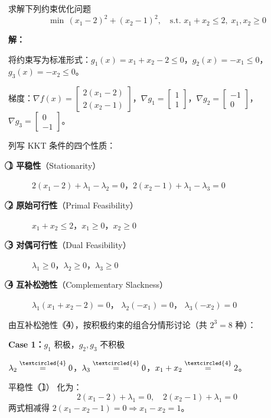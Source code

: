 \begin{example}[KKT条件求解]\label{ex:kkt-solve}
求解下列约束优化问题
\[
\min \, (x_1 - 2)^2 + (x_2 - 1)^2, \quad \text{s.t. } x_1 + x_2 \leq 2, \; x_1, x_2 \geq 0
\]

\textbf{解：}

\noindent 将约束写为标准形式：$g_1(x) = x_1 + x_2 - 2 \leq 0$，$g_2(x) = -x_1 \leq 0$，$g_3(x) = -x_2 \leq 0$。

梯度：$\nabla f(x) = \begin{bmatrix} 2(x_1-2) \\ 2(x_2-1) \end{bmatrix}$，$\nabla g_1 = \begin{bmatrix} 1 \\ 1 \end{bmatrix}$，$\nabla g_2 = \begin{bmatrix} -1 \\ 0 \end{bmatrix}$，$\nabla g_3 = \begin{bmatrix} 0 \\ -1 \end{bmatrix}$。

列写 KKT 条件的四个性质：
\begin{description}
\item[\textbf{\textcircled{1} 平稳性}（Stationarity）]
$2(x_1-2) + \lambda_1 - \lambda_2 = 0$，\quad $2(x_2-1) + \lambda_1 - \lambda_3 = 0$
\item[\textbf{\textcircled{2} 原始可行性}（Primal Feasibility）]
$x_1 + x_2 \leq 2$，$x_1 \geq 0$，$x_2 \geq 0$
\item[\textbf{\textcircled{3} 对偶可行性}（Dual Feasibility）]
$\lambda_1 \geq 0$，$\lambda_2 \geq 0$，$\lambda_3 \geq 0$
\item[\textbf{\textcircled{4} 互补松弛性}（Complementary Slackness）]
$\lambda_1(x_1 + x_2 - 2) = 0$，\quad
$\lambda_2(-x_1) = 0$，\quad
$\lambda_3(-x_2) = 0$
\end{description}

由互补松弛性（\textcircled{4}），按积极约束的组合分情形讨论（共 $2^3 = 8$ 种）：

\medskip\noindent\textbf{Case 1：}$g_1$ 积极，$g_2,g_3$ 不积极

$\lambda_2 \stackrel{\textcircled{4}}{=} 0$，$\lambda_3 \stackrel{\textcircled{4}}{=} 0$，$x_1 + x_2 \stackrel{\textcircled{4}}{=} 2$。

平稳性（\textcircled{1}） 化为：
\[
2(x_1-2) + \lambda_1 = 0,\quad 2(x_2-1) + \lambda_1 = 0
\]
两式相减得 $2(x_1 - x_2 - 1) = 0 \Rightarrow x_1 - x_2 = 1$。


\end{example}
